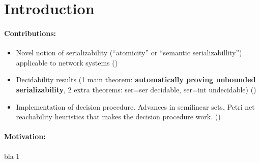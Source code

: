 \section{Introduction}
\label{sec:introduction}






\paragraph{Contributions:}
\begin{itemize}
    \item Novel notion of serializability (``atomicity'' or ``semantic serializabillity'') applicable to network systems ()
    \item Decidability results (1 main theorem: \textbf{automatically proving unbounded serializability}, 2 extra theorems: ser=ser decidable, ser=int undecidable) ()
    \item Implementation of decision procedure. Advances in semilinear sets, Petri net reachability heuristics that makes the decision procedure work. ()
\end{itemize}

\newpage


\paragraph{Motivation:}

bla 1


